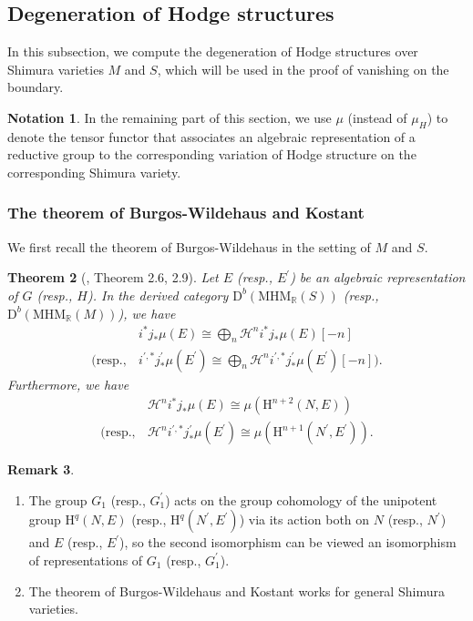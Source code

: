 \documentclass[11pt, a4paper]{amsart}
\theoremstyle{plain}
\newtheorem{theorem}{Theorem}[section]
\theoremstyle{definition}
\newtheorem{remark}[theorem]{Remark}
\newtheorem{notation}[theorem]{Notation}
\numberwithin{equation}{section}
\def\RR{\mathbb{R}}
\begin{document}
\subsection{Degeneration of Hodge structures}
\label{SS: thm of BW and Kostant}
In this subsection, we compute the degeneration of Hodge structures over Shimura varieties $M$ and $S$, which will be used in the proof of vanishing on the boundary.

\begin{notation}
In the remaining part of this section, we use $\mu$ (instead of $\mu_{H}$) to denote the tensor functor that associates an algebraic representation of a reductive group to the corresponding variation of Hodge structure on the corresponding Shimura variety.  
\end{notation}

\subsubsection{The theorem of Burgos-Wildehaus and Kostant}
We first recall the theorem of Burgos-Wildehaus in the setting of $M$ and $S$. 

\begin{theorem}[\cite{BW04}, Theorem  2.6, 2.9]
\label{theorem: BW04}
Let $E$ (resp., $E^{\prime}$) be an algebraic representation of $G$ (resp., $H$). In the derived category $\mathrm{D}^{b}(\mathrm{MHM}_{\RR}(S))$ (resp., $\mathrm{D}^{b}(\mathrm{MHM}_{\RR}(M))$), we have 
\begin{align*}
    & i^{*}j_{*} \mu(E) \cong \bigoplus_{n} \mathcal{H}^{n}i^{*}j_{*} \mu(E)[-n] \\ 
    (\text{resp.,} \, & i^{\prime, *}j_{*}^{\prime} \mu(E^{\prime}) \cong \bigoplus_{n} \mathcal{H}^{n}i^{\prime, *}j_{*}^{\prime} \mu(E^{\prime})[-n]). 
\end{align*}
Furthermore, we have 
\begin{align*}
    & \mathcal{H}^{n}i^{*}j_{*} \mu(E) \cong  \mu(\mathrm{H}^{n + 2}(N, E)) \\
   (\text{resp.,} \,  & \mathcal{H}^{n}i^{\prime, *}j_{*}^{\prime} \mu(E^{\prime}) \cong  \mu(\mathrm{H}^{n + 1}(N^{\prime}, E^{\prime})).
\end{align*}
\end{theorem}

\begin{remark}
    \begin{enumerate}
        \item The group $G_1$ (resp., $G_{1}^{\prime}$) acts on the group cohomology of the unipotent group $\mathrm{H}^{q}(N, E)$ (resp., $\mathrm{H}^{q}(N^{\prime}, E^{\prime})$) via its action both on $N$ (resp., $N^{\prime}$) and $E$ (resp., $E^{\prime}$), so the second isomorphism can be viewed an isomorphism of representations of $G_1$ (resp., $G_{1}^{\prime}$). 
        \item The theorem of Burgos-Wildehaus and Kostant works for general Shimura varieties. 
    \end{enumerate}
\end{remark}
\end{document}
